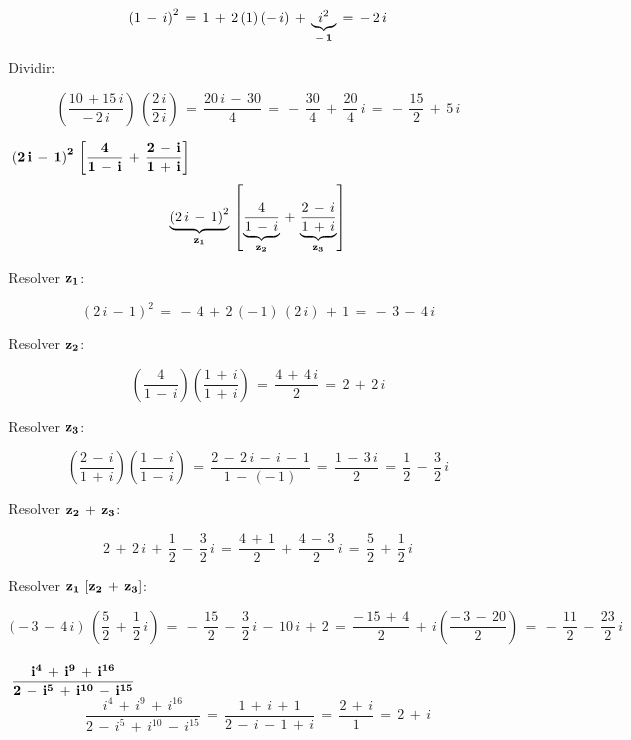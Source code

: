 \documentclass[a4paper,11pt,openany]{book}
\begin{document}
$$\left(1\,-\,i\right)^{2}\,=\,1\,+\,2\,(1)\,(-\,i)\,+\,\underbrace{i^{2}}_{\bf{-\,1}}\,=\,-\,2\,i$$

\textcolor{ao(english)}{}\,Dividir:

$$\left(\dfrac{10\,+15\,i}{-\,2\,i}\right)\,\left(\dfrac{2\,i}{2\,i}\right)\,=\,\dfrac{20\,i\,-\,30}{4}\,=\,-\,\dfrac{30}{4}\,+\,\dfrac{20}{4}\,i\,=\,-\,\dfrac{15}{2}\,+\,5\,i$$

\textcolor{ao(english)}{}\,\quad\,$\bf{\left(2\,i\,-\,1\right)^{2}\,\left[\dfrac{4}{1\,-\,i}\,+\,\dfrac{2\,-\,i}{1\,+\,i}\right]}$\\

$$\underbrace{\left(2\,i\,-\,1\right)^{2}}_{\bf{z_{1}}}\,\left[\underbrace{\dfrac{4}{1\,-\,i}}_{\bf{z_{2}}}\,+\,\underbrace{\dfrac{2\,-\,i}{1\,+\,i}}_{\bf{z_{3}}}\right]$$

\textcolor{ao(english)}{}\,Resolver $\bf{z_{1}}$:

$$\left(2\,i\,-\,1\right)^{2}\,=\,-\,4\,+\,2\,(-\,1)\,(2\,i)\,+\,1\,=\,-\,3\,-\,4\,i$$

\textcolor{ao(english)}{}\,Resolver $\bf{z_{2}}$:

$$\left(\dfrac{4}{1\,-\,i}\right)\left(\dfrac{1\,+\,i}{1\,+\,i}\right)\,=\,\dfrac{4\,+\,4\,i}{2}\,=\,2\,+\,2\,i$$

\textcolor{ao(english)}{}\,Resolver $\bf{z_{3}}$:

$$\left(\dfrac{2\,-\,i}{1\,+\,i}\right)\left(\dfrac{1\,-\,i}{1\,-\,i}\right)\,=\,\dfrac{2\,-\,2\,i\,-\,i\,-\,1}{1\,-\,(-\,1)}\,=\,\dfrac{1\,-\,3\,i}{2}\,=\,\dfrac{1}{2}\,-\,\dfrac{3}{2}\,i$$

\textcolor{ao(english)}{}\,Resolver $\bf{z_{2}\,+\,z_{3}}$:

$$2\,+\,2\,i\,+\,\dfrac{1}{2}\,-\,\dfrac{3}{2}\,i\,=\,\dfrac{4\,+\,1}{2}\,+\,\dfrac{4\,-\,3}{2}\,i\,=\,\dfrac{5}{2}\,+\,\dfrac{1}{2}\,i$$


\textcolor{ao(english)}{}\,Resolver $\bf{z_{1}\,\left[z_{2}\,+\,z_{3}\right]}$:

$$\left(-\,3\,-\,4\,i\right)\,\left(\dfrac{5}{2}\,+\,\dfrac{1}{2}\,i\right)\,=\,-\,\dfrac{15}{2}\,-\,\dfrac{3}{2}\,i\,-\,10\,i\,+\,2\,=\,\dfrac{-\,15\,+\,4}{2}\,+\,i\left(\dfrac{-\,3\,-\,20}{2}\right)\,=\,-\,\dfrac{11}{2}\,-\,\dfrac{23}{2}\,i$$\\

\textcolor{ao(english)}{}\,\quad\,$\bf{\dfrac{i^{4}\,+\,i^{9}\,+\,i^{16}}{2\,-\,i^{5}\,+\,i^{10}\,-\,i^{15}}}$\\

$$\dfrac{i^{4}\,+\,i^{9}\,+\,i^{16}}{2\,-\,i^{5}\,+\,i^{10}\,-\,i^{15}}\,=\,\dfrac{1\,+\,i\,+\,1}{2\,-\,i\,-\,1\,+\,i}\,=\,\dfrac{2\,+\,i}{1}\,=\,2\,+\,i$$
\end{document}
